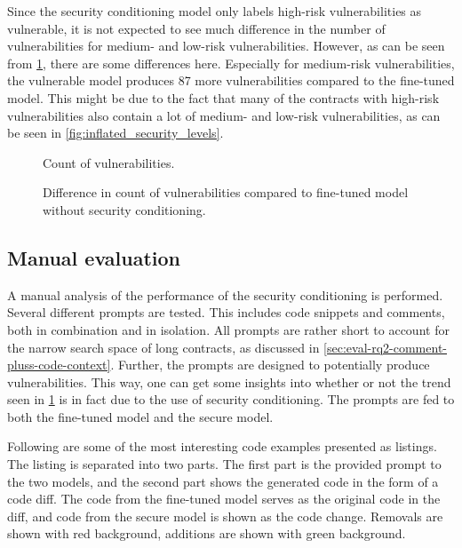 Since the security conditioning model only labels high-risk vulnerabilities as vulnerable, it is not expected to see much difference in the number of vulnerabilities for medium- and low-risk vulnerabilities. However, as can be seen from \cref{fig:vulnerability-count-diff}, there are some differences here. Especially for medium-risk vulnerabilities, the vulnerable model produces 87 more vulnerabilities compared to the fine-tuned model. This might be due to the fact that many of the contracts with high-risk vulnerabilities also contain a lot of medium- and low-risk vulnerabilities, as can be seen in \cref{fig:inflated_security_levels}. 

\begin{figure}[htp]
    \centering
    
    \caption{Count of vulnerabilities.}
    \label{fig:vulnerability-count}
    \vspace*{\floatsep}%
    
    \caption{Difference in count of vulnerabilities compared to fine-tuned model without security conditioning.}
    \label{fig:vulnerability-count-diff}
\end{figure}


\subsection{Manual evaluation}
\label{sec:eval-manual}
A manual analysis of the performance of the security conditioning is performed. Several different prompts are tested. This includes code snippets and comments, both in combination and in isolation. All prompts are rather short to account for the narrow search space of long contracts, as discussed in \cref{sec:eval-rq2-comment-pluss-code-context}. Further, the prompts are designed to potentially produce vulnerabilities. This way, one can get some insights into whether or not the trend seen in \cref{fig:vulnerability-count-diff} is in fact due to the use of security conditioning. The prompts are fed to both the fine-tuned model and the secure model.

Following are some of the most interesting code examples presented as listings. The listing is separated into two parts. The first part is the provided prompt to the two models, and the second part shows the generated code in the form of a code diff. The code from the fine-tuned model serves as the original code in the diff, and code from the secure model is shown as the code change. Removals are shown with red background, additions are shown with green background.

